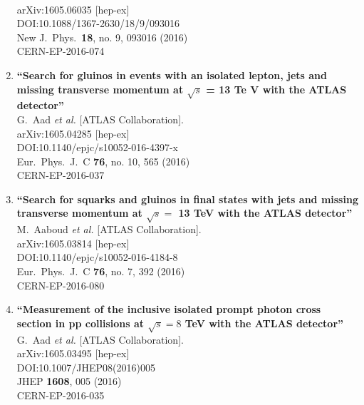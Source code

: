 \documentclass{article}
\begin{document}
\begin{enumerate}
  \\{}arXiv:1605.06035 [hep-ex]
  \\{}DOI:10.1088/1367-2630/18/9/093016
  \\{}New J.\ Phys.\  {\bf 18}, no. 9, 093016 (2016)
  \\{}CERN-EP-2016-074
\item%
{\bf ``Search for gluinos in events with an isolated lepton, jets and missing transverse momentum at $\sqrt{s}$ = 13 Te V with the ATLAS detector''}
  \\{}G.~Aad {\it et al.} [ATLAS Collaboration].
  \\{}arXiv:1605.04285 [hep-ex]
  \\{}DOI:10.1140/epjc/s10052-016-4397-x
  \\{}Eur.\ Phys.\ J.\ C {\bf 76}, no. 10, 565 (2016)
  \\{}CERN-EP-2016-037
\item%
{\bf ``Search for squarks and gluinos in final states with jets and missing transverse momentum at $\sqrt{s} =$ 13 TeV with the ATLAS detector''}
  \\{}M.~Aaboud {\it et al.} [ATLAS Collaboration].
  \\{}arXiv:1605.03814 [hep-ex]
  \\{}DOI:10.1140/epjc/s10052-016-4184-8
  \\{}Eur.\ Phys.\ J.\ C {\bf 76}, no. 7, 392 (2016)
  \\{}CERN-EP-2016-080
\item%
{\bf ``Measurement of the inclusive isolated prompt photon cross section in pp collisions at $ \sqrt{s}=8 $ TeV with the ATLAS detector''}
  \\{}G.~Aad {\it et al.} [ATLAS Collaboration].
  \\{}arXiv:1605.03495 [hep-ex]
  \\{}DOI:10.1007/JHEP08(2016)005
  \\{}JHEP {\bf 1608}, 005 (2016)
  \\{}CERN-EP-2016-035

\end{enumerate}
\end{document}
